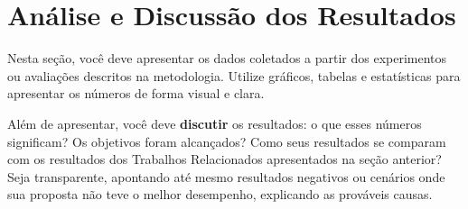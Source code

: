 \section{Análise e Discussão dos Resultados}
\label{sec:analise_resultados}

Nesta seção, você deve apresentar os dados coletados a partir dos experimentos ou avaliações descritos na metodologia. Utilize gráficos, tabelas e estatísticas para apresentar os números de forma visual e clara.

Além de apresentar, você deve \textbf{discutir} os resultados: o que esses números significam? Os objetivos foram alcançados? Como seus resultados se comparam com os resultados dos Trabalhos Relacionados apresentados na seção anterior? Seja transparente, apontando até mesmo resultados negativos ou cenários onde sua proposta não teve o melhor desempenho, explicando as prováveis causas.
